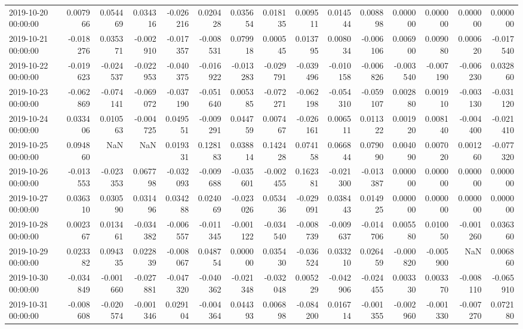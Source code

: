 \begin{tabular}{lrrrrrrrrrrrrrr}
2019-10-20 00:00:00 & 0.007966 & 0.054469 & 0.034316 & -0.026216 & 0.020428 & 0.035654 & 0.018135 & 0.009511 & 0.014544 & 0.008898 & 0.000000 & 0.000000 & 0.000000 & 0.000000 \\
2019-10-21 00:00:00 & -0.018276 & 0.035371 & -0.002910 & -0.017357 & -0.008531 & 0.079918 & 0.000545 & 0.013795 & 0.008034 & -0.006106 & 0.006900 & 0.009080 & 0.000620 & -0.017540 \\
2019-10-22 00:00:00 & -0.019623 & -0.024537 & -0.022953 & -0.040375 & -0.016922 & -0.013283 & -0.029791 & -0.039496 & -0.010158 & -0.006826 & -0.003540 & -0.007190 & -0.006230 & 0.032860 \\
2019-10-23 00:00:00 & -0.062869 & -0.074141 & -0.069072 & -0.037190 & -0.051640 & 0.005385 & -0.072271 & -0.062198 & -0.054310 & -0.059107 & 0.002880 & 0.001910 & -0.003130 & -0.031120 \\
2019-10-24 00:00:00 & 0.033406 & 0.010563 & -0.004725 & 0.049551 & -0.009291 & 0.044759 & 0.007467 & -0.026161 & 0.006511 & 0.011322 & 0.001920 & 0.008140 & -0.004400 & -0.021410 \\
2019-10-25 00:00:00 & 0.094860 & NaN & NaN & 0.019331 & 0.128183 & 0.038814 & 0.142428 & 0.074158 & 0.066844 & 0.079090 & 0.004090 & 0.007020 & 0.001260 & -0.077320 \\
2019-10-26 00:00:00 & -0.013553 & -0.023353 & 0.067798 & -0.032093 & -0.009688 & -0.035601 & -0.002455 & 0.162381 & -0.021300 & -0.013387 & 0.000000 & 0.000000 & 0.000000 & 0.000000 \\
2019-10-27 00:00:00 & 0.036310 & 0.030590 & 0.031496 & 0.034288 & 0.024069 & -0.023026 & 0.053436 & -0.029091 & 0.038443 & 0.014925 & 0.000000 & 0.000000 & 0.000000 & 0.000000 \\
2019-10-28 00:00:00 & 0.002367 & 0.013461 & -0.034382 & -0.006557 & -0.011345 & -0.001122 & -0.034540 & -0.008739 & -0.009637 & -0.014706 & 0.005580 & 0.010050 & -0.001260 & 0.036360 \\
2019-10-29 00:00:00 & 0.023382 & 0.094335 & 0.022839 & -0.008067 & 0.048754 & 0.000000 & 0.035430 & -0.036524 & 0.033210 & 0.026459 & -0.000820 & -0.005900 & NaN & 0.006860 \\
2019-10-30 00:00:00 & -0.034849 & -0.001660 & -0.027881 & -0.047320 & -0.040362 & -0.021348 & -0.032048 & 0.005229 & -0.042906 & -0.024455 & 0.003330 & 0.003370 & -0.008110 & -0.065910 \\
2019-10-31 00:00:00 & -0.008608 & -0.020574 & -0.001346 & 0.029104 & -0.004364 & 0.044393 & 0.006898 & -0.084200 & 0.016714 & -0.001355 & -0.002960 & -0.001330 & -0.007270 & 0.072180 \\

\end{tabular}
